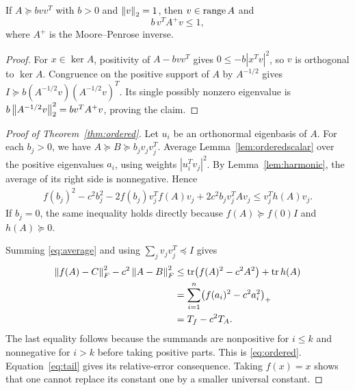 \documentclass[11pt]{article}
\newcommand{\TA}{T_A}
\newcommand{\Tf}{T_f}
\begin{document}
\begin{lemma}\label{lem:harmonic}
If $A\succeq bvv^T$ with $b>0$ and $\left\lVert v\right\rVert_2=1$, then $v\in\operatorname{range} A$ and
\[
 b\,v^TA^+v\le1,
\]
where $A^+$ is the Moore--Penrose inverse.
\end{lemma}
\begin{proof}
For $x\in\ker A$, positivity of $A-bvv^T$ gives $0\le-b|x^Tv|^2$, so $v$ is orthogonal to $\ker A$. Congruence on the positive support of $A$ by $A^{-1/2}$ gives $I\succeq b(A^{-1/2}v)(A^{-1/2}v)^T$. Its single possibly nonzero eigenvalue is $b\left\lVert A^{-1/2}v\right\rVert_2^2=bv^TA^+v$, proving the claim.
\end{proof}

\begin{proof}[Proof of Theorem~\ref{thm:ordered}]
Let $u_i$ be an orthonormal eigenbasis of $A$. For each $b_j>0$, we have $A\succeq B\succeq b_jv_jv_j^T$. Average Lemma~\ref{lem:orderedscalar} over the positive eigenvalues $a_i$, using weights $|u_i^Tv_j|^2$. By Lemma~\ref{lem:harmonic}, the average of its right side is nonnegative. Hence
\begin{align}\label{eq:average}
 f(b_j)^2-c^2b_j^2-2f(b_j)v_j^Tf(A)v_j
       +2c^2b_jv_j^TAv_j
 \le v_j^Th(A)v_j.
\end{align}
If $b_j=0$, the same inequality holds directly because $f(A)\succeq f(0)I$ and $h(A)\succeq0$.

Summing \eqref{eq:average} and using $\sum_jv_jv_j^T\preceq I$ gives
\begin{align*}
 \norm{f(A)-C}_F^2-c^2\norm{A-B}_F^2
 &\le\tr\bigl(f(A)^2-c^2A^2\bigr)+\tr h(A)\\
 &=\sum_{i=1}^n\bigl(f(a_i)^2-c^2a_i^2\bigr)_+\\
 &=\Tf-c^2\TA.
\end{align*}
The last equality follows because the summands are nonpositive for $i\le k$ and nonnegative for $i>k$ before taking positive parts. This is \eqref{eq:ordered}. Equation~\eqref{eq:tail} gives its relative-error consequence. Taking $f(x)=x$ shows that one cannot replace its constant one by a smaller universal constant.
\end{proof}
\end{document}
